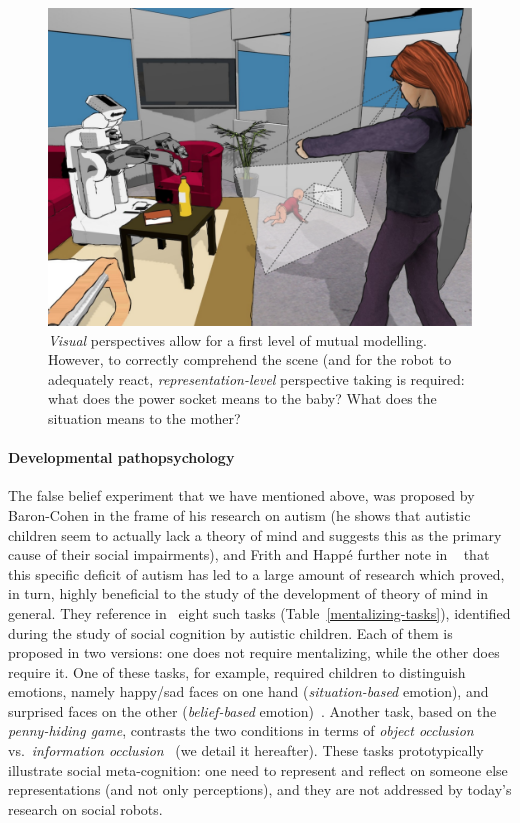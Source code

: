 \documentclass{sig-alternate}
\begin{document}
\begin{figure}
        \centering
        \includegraphics[width=0.9\columnwidth]{representation-perspective-taking}
        \caption{\small \emph{Visual} perspectives allow for a first level of
            mutual modelling. However, to correctly comprehend the scene (and
            for the robot to adequately react, \emph{representation-level}
            perspective taking is required: what does the power socket means to
            the baby? What does the situation means to the mother?}

        \label{representation-level}
\end{figure}

\paragraph{Developmental pathopsychology}

The false belief experiment that we have mentioned above, was proposed by
Baron-Cohen in the frame of his research on autism (he shows that autistic
children seem to actually lack a theory of mind and suggests this as the primary
cause of their social impairments), and Frith and Happé further note in
~\cite{frith1994autism} that this specific deficit of autism has led to a large
amount of research which proved, in turn, highly beneficial to the study of the
development of theory of mind in general. They reference
in~\cite{frith1994autism} eight such tasks (Table~\ref{mentalizing-tasks}),
identified during the study of social cognition by autistic children. Each of
them is proposed in two versions: one does not require mentalizing, while the
other does require it.  One of these tasks, for example, required children to
distinguish emotions, namely happy/sad faces on one hand (\emph{situation-based}
emotion), and surprised faces on the other (\emph{belief-based}
emotion)~\cite{baron1993children}.  Another task, based on the
\emph{penny-hiding game}, contrasts the two conditions in terms of \emph{object
occlusion} vs.~\emph{information occlusion}~\cite{baron1992out} (we detail it
hereafter). These tasks prototypically illustrate social meta-cognition: one
need to represent and reflect on someone else representations (and not only
perceptions), and they are not addressed by today's research on social robots.
\end{document}
